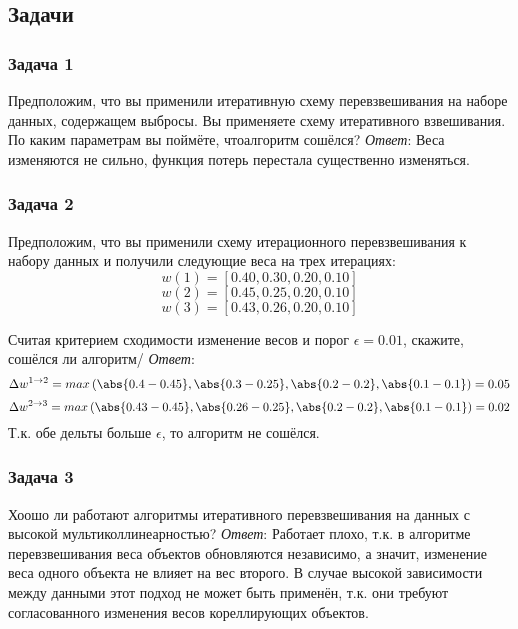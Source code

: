 \subsection{Задачи}
\subsubsection{Задача 1}
Предположим, что вы применили итеративную схему перевзвешивания на наборе
данных, содержащем выбросы. Вы применяете схему итеративного взвешивания.
По каким параметрам вы поймёте, чтоалгоритм сошёлся?
\textit{Ответ}: Веса изменяются не сильно, функция потерь перестала существенно
изменяться.
\subsubsection{Задача 2}
Предположим, что вы применили схему итерационного перевзвешивания к набору
данных и получили следующие веса на трех итерациях:
\[ w(1) = [0.40, 0.30, 0.20, 0.10] \]
\[ w(2) = [0.45, 0.25, 0.20 ,0.10] \]
\[ w(3) = [0.43, 0.26, 0.20, 0.10] \]

Считая критерием сходимости изменение весов и порог \(\epsilon = 0.01\),
скажите, сошёлся ли алгоритм/
\textit{Ответ}:
\[ \Delta w^{1\rightarrow2} = max\left( \abs{0.4-0.45}, \abs{0.3 - 0.25}, \abs{0.2-0.2}, \abs{0.1-0.1}  \right) = 0.05 \]
\[ \Delta w^{2\rightarrow3} = max\left( \abs{0.43-0.45}, \abs{0.26 - 0.25}, \abs{0.2-0.2}, \abs{0.1-0.1}  \right) = 0.02 \]
Т.к. обе дельты больше \(\epsilon\), то алгоритм не сошёлся.

\subsubsection{Задача 3}
Хоошо ли работают алгоритмы итеративного перевзвешивания на данных с высокой
мультиколлинеарностью?
\textit{Ответ}: Работает плохо, т.к. в алгоритме перевзвешивания веса объектов
обновляются независимо, а значит, изменение веса одного объекта не влияет на
вес второго. В случае высокой зависимости между данными этот подход не может
быть применён, т.к. они требуют согласованного изменения весов кореллирующих
объектов.


